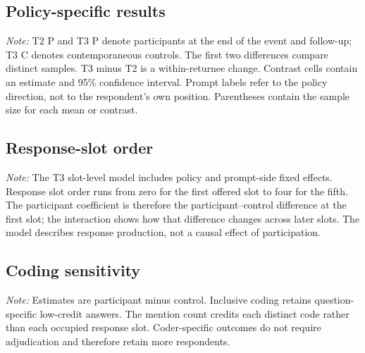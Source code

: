 \documentclass[11pt]{article}
\begin{document}
\clearpage
\begin{landscape}
\subsection{Policy-specific results}

\begin{table}[H]
\centering
\scriptsize
\caption{Mean coded reasons and contrasts by policy and prompt}
\resizebox{\linewidth}{!}{%

}
\begin{minipage}{0.96\linewidth}
\smallskip\footnotesize
\textit{Note:} T2 P and T3 P denote participants at the end of the event and follow-up; T3 C
denotes contemporaneous controls. The first two differences compare distinct samples. T3
minus T2 is a within-returnee change. Contrast cells contain an estimate and 95\% confidence
interval. Prompt labels refer to the policy direction, not to the respondent's own position.
Parentheses contain the sample size for each mean or contrast.
\end{minipage}
\end{table}
\end{landscape}

\subsection{Response-slot order}

\begin{table}[H]
\centering
\caption{Linear probability model for whether a response slot contains a valid reason}

\begin{minipage}{0.95\textwidth}
\smallskip\footnotesize
\textit{Note:} The T3 slot-level model includes policy and prompt-side fixed effects. Response
slot order runs from zero for the first offered slot to four for the fifth. The participant
coefficient is therefore the participant--control difference at the first slot; the interaction
shows how that difference changes across later slots. The model describes response production,
not a causal effect of participation.
\end{minipage}
\end{table}

\subsection{Coding sensitivity}

\begin{table}[H]
\centering
\caption{Sensitivity of the total-repertoire T3 comparison to coding choices}

\begin{minipage}{0.95\textwidth}
\smallskip\footnotesize
\textit{Note:} Estimates are participant minus control. Inclusive coding retains
question-specific low-credit answers. The mention count credits each distinct code rather than
each occupied response slot. Coder-specific outcomes do not require adjudication and therefore
retain more respondents.
\end{minipage}
\end{table}
\end{document}
